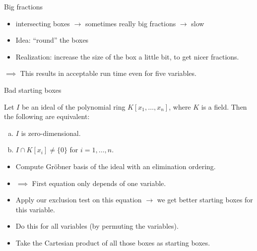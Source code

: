 \documentclass[german,10pt,xcolor=colortbl,compress]{beamer}
\begin{document}
\begin{frame}{Big fractions}
    \begin{itemize}
        \item intersecting boxes $\rightarrow$ sometimes really big fractions $\rightarrow$ slow
        \item Idea: \enquote{round} the boxes
        \item Realization: increase the size of the box a little bit, to get nicer fractions.
    \end{itemize}
    \bigskip
    \pause

    \begin{center}
    \end{center}
    \pause

    $\implies$ This results in acceptable run time even for five variables.
\end{frame}

\begin{frame}{Bad starting boxes}
    \begin{lemma}
        Let $I$ be an ideal of the polynomial ring $K[x_1, \hdots, x_n]$, where $K$ is a
        field. Then the following are equivalent:
        \begin{enumerate}[a)]
            \item $I$ is zero-dimensional.
            \item $I \cap K[x_i] \neq \{0\}$ for $i=1,\hdots, n$.
        \end{enumerate}
    \end{lemma}
    \pause

    \begin{itemize}
        \item Compute Gröbner basis of the ideal with an elimination ordering.
        \item[] $\implies$ First equation only depends of one variable.
        \pause
        \item Apply our exclusion test on this equation $\rightarrow$ we get better
            starting boxes for this variable.
        \item Do this for all variables (by permuting the variables).
        \item Take the Cartesian product of all those boxes as starting boxes.
    \end{itemize}
\end{frame}
\end{document}
